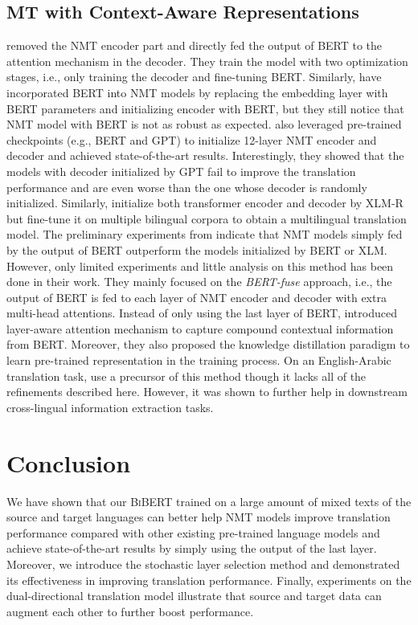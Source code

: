 \documentclass[11pt]{article}
\begin{document}
\subsection{MT with Context-Aware Representations}
\citet{imamura-sumita-2019-recycling} removed the NMT encoder part and directly fed the output of \textsc{BERT} to the attention mechanism in the decoder. They train the model with two optimization stages, i.e.,  only training the decoder and fine-tuning BERT. Similarly, \citet{clinchant-etal-2019-use} have incorporated \textsc{BERT} into NMT models by replacing the embedding layer with \textsc{BERT} parameters and initializing encoder with \textsc{BERT}, but they still notice that NMT model with \textsc{BERT} is not as robust as expected. \citet{rothe-etal-2020-leveraging} also leveraged pre-trained checkpoints (e.g., \textsc{BERT} and \textsc{GPT}) to initialize 12-layer NMT encoder and decoder and achieved state-of-the-art results. Interestingly, they showed that the models with decoder initialized by \textsc{GPT} fail to improve the translation performance and are even worse than the one whose decoder is randomly initialized. Similarly, \citet{ma2020xlm} initialize both transformer encoder and decoder by \textsc{XLM-R} but fine-tune it on multiple bilingual corpora to obtain a multilingual translation model. The preliminary experiments from \citet{Zhu2020Incorporating} indicate that NMT models simply fed by the output of \textsc{BERT} outperform the models initialized by \textsc{BERT} or \textsc{XLM}. However, only limited experiments and little analysis on this method has been done in their work. They mainly focused on the \textit{BERT-fuse} approach, i.e., the output of \textsc{BERT} is fed to each layer of NMT encoder and decoder with extra multi-head attentions. Instead of only using the last layer of \textsc{BERT}, \citet{weng2020acquiring} introduced layer-aware attention mechanism to capture compound contextual information from \textsc{BERT}. Moreover, they also proposed the knowledge distillation paradigm to learn pre-trained representation in the training process. On an English-Arabic translation task, \citet{yarmohammadi-etal-2021-everything} use a precursor of this method though it lacks all of the refinements described here. However, it was shown to further help in downstream cross-lingual information extraction tasks.



\section{Conclusion}
We have shown that our \textsc{BiBERT} trained on a large amount of mixed texts of the source and target languages can better help NMT models improve translation performance compared with other existing pre-trained language models and achieve state-of-the-art results by simply using the output of the last layer. Moreover, we introduce the stochastic layer selection method and demonstrated its effectiveness in improving translation performance. Finally, experiments on the dual-directional translation model illustrate that source and target data can augment each other to further boost  performance.
\end{document}
